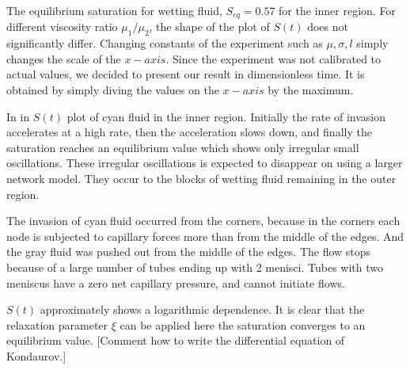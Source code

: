 	The equilibrium saturation for wetting fluid, $S_{eq} = 0.57$ for the inner region. For different viscosity ratio ${\mu}_1 / {\mu_2}$, the shape of the plot of $S(t)$ does not significantly differ. Changing constants of the experiment such as $\mu, \sigma, l$ simply changes the scale of the $x-axis$. Since the experiment was not calibrated to actual values, we decided to present our result in dimensionless time. It is obtained by simply diving the values on the $x-axis$ by the maximum.
	
	In in $S(t)$ plot of cyan fluid in the inner region. Initially the rate of invasion accelerates at a high rate, then the acceleration slows down, and finally the saturation reaches an equilibrium value which shows only irregular small oscillations. These irregular oscillations is expected to disappear on using a larger network model. They occur to the blocks of wetting fluid remaining in the outer region.
	
	The invasion of cyan fluid occurred from the corners, because in the corners each node is subjected to capillary forces more than from the middle of the edges. And the gray fluid was pushed out from the middle of the edges. The flow stops because of a large number of tubes ending up with 2 menisci. Tubes with two meniscus have a zero net capillary pressure, and cannot initiate flows. 
	
	$S(t)$ approximately shows a logarithmic dependence. It is clear that the relaxation parameter $\xi$ can be applied here the saturation converges to an equilibrium value. [Comment how to write the differential equation of Kondaurov.]

		
		
	

